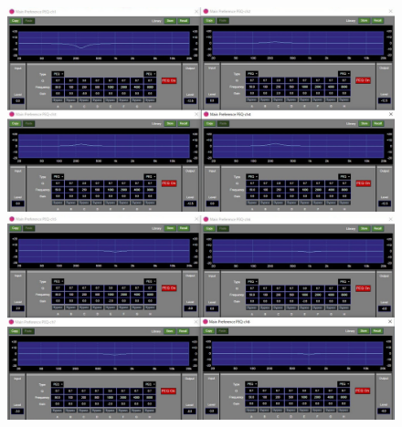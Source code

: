 \documentclass[11pt,a4j]{jreport}
\begin{document}

\begin{figure}[H]
  \begin{minipage}[b]{.5\linewidth}
    \centering
    \includegraphics[width=.9\linewidth]{images/experimentField/afcParameters/04delta/05manualEQ6.jpg}
  \end{minipage}%
  \begin{minipage}[b]{.5\linewidth}
    \centering
    \includegraphics[width=.9\linewidth]{images/experimentField/afcParameters/04delta/05manualEQ7.jpg}
  \end{minipage}


\end{figure}
\end{document}
